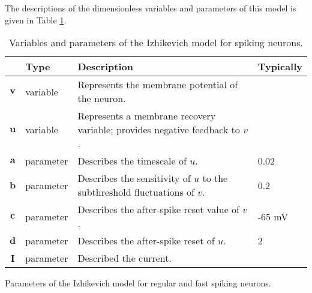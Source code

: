 The descriptions of the dimensionless variables and parameters of this model is given in Table \ref{tab:vars-params-izhikevich-model}.

\begin{table}[!htp] \centering
\begin{tabular}{m{}<{\centering}|m{}<{\centering}|m{}|m{}<{\centering}|}
\cline{2-4}
                                                  & \cellcolor{main-color}\textbf{Type} & \cellcolor{main-color}\textbf{Description}                                & \cellcolor{main-color}\textbf{Typically} \\ \hline
\multicolumn{1}{|c|}{\cellcolor{main-color}$\pmb{v}$} & variable                              & Represents the membrane potential of the neuron.                            &                                                \\ \hline
\multicolumn{1}{|c|}{\cellcolor{main-color}$\pmb{u}$} & variable                              & Represents a membrane recovery variable; provides negative feedback to $v$. &                                                \\ \hline
\multicolumn{1}{|c|}{\cellcolor{main-color}$\pmb{a}$} & parameter                             & Describes the timescale of $u$.                                             & 0.02                                           \\ \hline
\multicolumn{1}{|c|}{\cellcolor{main-color}$\pmb{b}$} & parameter                             & Describes the sensitivity of $u$ to the subthreshold fluctuations of $v$.   & 0.2                                            \\ \hline
\multicolumn{1}{|c|}{\cellcolor{main-color}$\pmb{c}$} & parameter                             & Describes the after-spike reset value of $v$.                               & -65 mV                                         \\ \hline
\multicolumn{1}{|c|}{\cellcolor{main-color}$\pmb{d}$} & parameter                             & Describes the after-spike reset of $u$.                                     & 2                                              \\ \hline
\multicolumn{1}{|c|}{\cellcolor{main-color}$\pmb{I}$} & parameter                             & Described the current.                                                      &                                                \\ \hline
\end{tabular}
\caption{Variables and parameters of the Izhikevich model for spiking neurons.}
\label{tab:vars-params-izhikevich-model}
\end{table}

\begin{table}[!htp] 
    \centering
    
    \caption{Parameters of the Izhikevich model for regular and fast spiking neurons.}
\label{tab:vars-params-izhikevich-model}
\end{table}